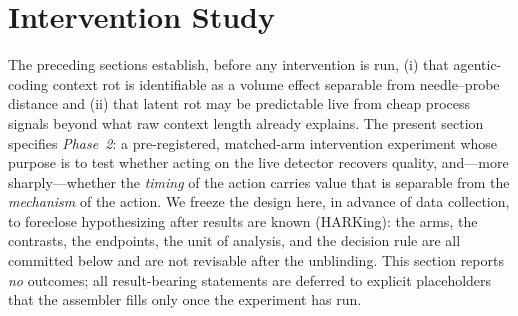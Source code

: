 %
%
%
%
%

\makeatletter
{}%
\makeatother

\providecommand{\resultplaceholder}[1]{%
  \textbf{[\,RESULT: #1 --- pending Phase-2 data; assembler to fill\,]}%
}

\section{Intervention Study}
\label{sec:intervention}

The preceding sections establish, before any intervention is run, (i) that
agentic-coding context rot is identifiable as a volume effect separable from
needle--probe distance and (ii) that latent rot may be predictable live from
cheap process signals beyond what raw context length already explains. The
present section specifies \emph{Phase~2}: a pre-registered, matched-arm
intervention experiment whose purpose is to test whether acting on the live
detector recovers quality, and---more sharply---whether the \emph{timing} of
the action carries value that is separable from the \emph{mechanism} of the
action. We freeze the design here, in advance of data collection, to foreclose
hypothesizing after results are known (HARKing): the arms, the contrasts, the
endpoints, the unit of analysis, and the decision rule are all committed below
and are not revisable after the unblinding. This section reports
\emph{no} outcomes; all result-bearing statements are deferred to explicit
placeholders that the assembler fills only once the experiment has run.

